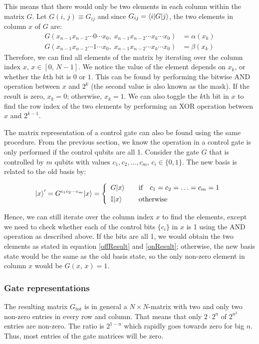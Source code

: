 \documentclass[bibliography=totocnumbered, 10pt]{article}
\theoremstyle{NoticeStyle}
\begin{document}
This means that there would only be two elements in each column within the matrix $G$. Let $G(i,\,j) \equiv G_{ij}$ and since $G_{ij} = {\left\langle{i}\right\vert} G {\left\vert{j}\right\rangle}$, the two elements in column $x$ of $G$ are:
\begin{align}
	G(x_{n-1}x_{n-2}\dotsm0\dotsm x_0,\;x_{n-1}x_{n-2}\dotsm x_k\dotsm x_0) &= \alpha(x_k)\label{offResult}\\ 
	G(x_{n-1}x_{n-2}\dotsm1\dotsm x_0,\;x_{n-1}x_{n-2}\dotsm x_k\dotsm x_0) &= \beta(x_k) \label{onResult}
\end{align}
Therefore, we can find all elements of the matrix by iterating over the column index $x$, $x \in [0,\,N-1]$. We notice the value of the element depends on $x_k$, or whether the $k$th bit is $0$ or $1$. This can be found by performing the bitwise AND operation between $x$ and $2^{k}$ (the second value is also known as the mask). If the result is zero, $x_k = 0$; otherwise, $x_k = 1$. We can also toggle the $k$th bit in $x$ to find the row index of the two elements by performing an XOR operation between $x$ and $2^{k-1}$.

The matrix representation of a control gate can also be found using the same procedure. From the previous section, we know the operation in a control gate is only performed if the control qubits are all 1. Consider the gate $G$ that is controlled by $m$ qubits with values $c_1, c_2, \dotsc, c_m$, $c_i \in \{0, 1\}$. The new basis is related to the old basis by:

\begin{align}
	{\left\vert{x}\right\rangle}' = G^{c_1c_2\dotsm c_m} {\left\vert{x}\right\rangle} = \left\{ 
	\begin{array}{ll}
		G{\left\vert{x}\right\rangle}  &  \quad\textrm{if}\quad c_1 = c_2 = \dotsc = c_m = 1\\[5pt]
		\mathbb{I}{\left\vert{x}\right\rangle} & \quad \textrm{otherwise}
	\end{array}
	\right.
\end{align}

Hence, we can still iterate over the column index $x$ to find the elements, except we need to check whether each of the control bits $\{c_i\}$ in $x$ is 1 using the AND operation as described above. If the bits are all 1, we would obtain the two elements as stated in equation \ref{offResult} and \ref{onResult}; otherwise, the new basis state would be the same as the old basis state, so the only non-zero element in column $x$ would be $G(x,\,x) = 1$.

\subsubsection{Gate representations}\label{sec:Gate representations}
The resulting matrix $G_\text{tot}$ is in general a $N \times N$-matrix with two and only two non-zero entries in every row and column. That means that only $2\cdot 2^n$ of $2^{n^2}$ entries are non-zero. The ratio is $2^{1-n}$ which rapidly goes towards zero for big $n$. Thus, most entries of the gate matrices will be zero.
\end{document}
